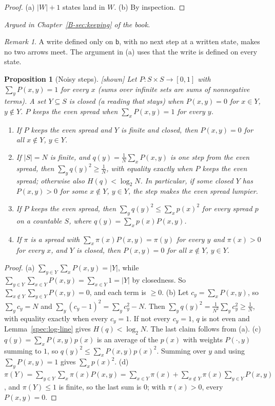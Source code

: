 \documentclass[11pt, a4paper]{article}
\theoremstyle{plain}
\newtheorem{proposition}[theorem]{Proposition}
\theoremstyle{definition}
\theoremstyle{remark}
\newtheorem{remark}[theorem]{Remark}
\newcommand{\argued}[1]{\par\noindent\textit{Argued in Chapter~\ref{B-#1} of the book.}\par}
\newcommand{\kind}[1]{\textup{[#1]}}
\begin{document}
\begin{proof}
(a) $|W|+1$ states land in $W$. (b) By inspection.
\end{proof}

\argued{sec:keeping}

\begin{remark}\label{spec:write-partial}
A write defined only on $\mathsf b$, with no next step at a written state, makes no two arrows meet. The
argument in (a) uses that the write is defined on every state.
\end{remark}

\begin{proposition}[Noisy steps]\label{spec:noisy} \kind{shown}
Let $P:S\times S\to[0,1]$ with $\sum_yP(x,y)=1$ for every $x$ (sums over infinite sets are sums of
nonnegative terms). A set $Y\subseteq S$ is \emph{closed} (a reading that stays) when $P(x,y)=0$ for
$x\in Y$, $y\notin Y$. $P$ \emph{keeps the even spread} when $\sum_xP(x,y)=1$ for every $y$.
\begin{enumerate}[label=(\alph*)]
\item If $P$ keeps the even spread and $Y$ is finite and closed, then $P(x,y)=0$ for all $x\notin Y$,
$y\in Y$.
\item If $|S|=N$ is finite, and $q(y)=\frac1N\sum_xP(x,y)$ is one step from the even spread, then
$\sum_yq(y)^2\ge\frac1N$, with equality exactly when $P$ keeps the even spread; otherwise also
$H(q)<\log_2N$. In particular, if some closed $Y$ has $P(x,y)>0$ for some $x\notin Y$, $y\in Y$, the step
makes the even spread lumpier.
\item If $P$ keeps the even spread, then $\sum_yq(y)^2\le\sum_xp(x)^2$ for every spread $p$ on a countable
$S$, where $q(y)=\sum_xp(x)P(x,y)$.
\item If $\pi$ is a spread with $\sum_x\pi(x)P(x,y)=\pi(y)$ for every $y$ and $\pi(x)>0$ for every $x$, and
$Y$ is closed, then $P(x,y)=0$ for all $x\notin Y$, $y\in Y$.
\end{enumerate}
\end{proposition}

\begin{proof}
(a) $\sum_{y\in Y}\sum_xP(x,y)=|Y|$, while $\sum_{y\in Y}\sum_{x\in Y}P(x,y)=\sum_{x\in Y}1=|Y|$ by
closedness. So $\sum_{x\notin Y}\sum_{y\in Y}P(x,y)=0$, and each term is $\ge0$.
(b) Let $c_y=\sum_xP(x,y)$, so $\sum_yc_y=N$ and $\sum_y(c_y-1)^2=\sum_yc_y^2-N$. Then
$\sum_yq(y)^2=\frac1{N^2}\sum_yc_y^2\ge\frac1N$, with equality exactly when every $c_y=1$. If not every
$c_y=1$, $q$ is not even and Lemma~\ref{spec:log-line} gives $H(q)<\log_2N$. The last claim follows from (a).
(c) $q(y)=\sum_xP(x,y)p(x)$ is an average of the $p(x)$ with weights $P(\cdot,y)$ summing to $1$, so
$q(y)^2\le\sum_xP(x,y)p(x)^2$. Summing over $y$ and using $\sum_yP(x,y)=1$ gives $\sum_xp(x)^2$.
(d) $\pi(Y)=\sum_{y\in Y}\sum_x\pi(x)P(x,y)=\sum_{x\in Y}\pi(x)+\sum_{x\notin Y}\pi(x)\sum_{y\in Y}P(x,y)$,
and $\pi(Y)\le1$ is finite, so the last sum is $0$; with $\pi(x)>0$, every $P(x,y)=0$.
\end{proof}
\end{document}
